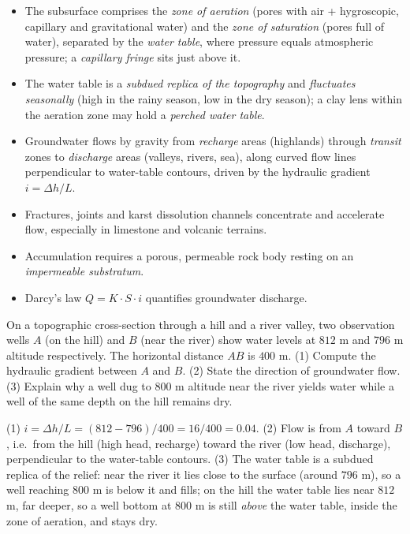 \documentclass[11pt]{article}
\begin{document}
\begin{aretenir}
\begin{itemize}
\item The subsurface comprises the \emph{zone of aeration} (pores with air + hygroscopic, capillary and gravitational water) and the \emph{zone of saturation} (pores full of water), separated by the \emph{water table}, where pressure equals atmospheric pressure; a \emph{capillary fringe} sits just above it.
\item The water table is a \emph{subdued replica of the topography} and \emph{fluctuates seasonally} (high in the rainy season, low in the dry season); a clay lens within the aeration zone may hold a \emph{perched water table}.
\item Groundwater flows by gravity from \emph{recharge} areas (highlands) through \emph{transit} zones to \emph{discharge} areas (valleys, rivers, sea), along curved flow lines perpendicular to water-table contours, driven by the hydraulic gradient $i = \Delta h / L$.
\item Fractures, joints and karst dissolution channels concentrate and accelerate flow, especially in limestone and volcanic terrains.
\item Accumulation requires a porous, permeable rock body resting on an \emph{impermeable substratum}.
\item Darcy's law $Q = K \cdot S \cdot i$ quantifies groundwater discharge.
\end{itemize}
\end{aretenir}

\begin{exercice}
On a topographic cross-section through a hill and a river valley, two observation wells $A$ (on the hill) and $B$ (near the river) show water levels at $812$ m and $796$ m altitude respectively. The horizontal distance $AB$ is $400$ m. (1) Compute the hydraulic gradient between $A$ and $B$. (2) State the direction of groundwater flow. (3) Explain why a well dug to $800$ m altitude near the river yields water while a well of the same depth on the hill remains dry.
\end{exercice}

\begin{corrige}[Exercise 1]
(1) $i = \Delta h / L = (812 - 796)/400 = 16/400 = 0.04$. (2) Flow is from $A$ toward $B$, i.e.\ from the hill (high head, recharge) toward the river (low head, discharge), perpendicular to the water-table contours. (3) The water table is a subdued replica of the relief: near the river it lies close to the surface (around $796$ m), so a well reaching $800$ m is below it and fills; on the hill the water table lies near $812$ m, far deeper, so a well bottom at $800$ m is still \emph{above} the water table, inside the zone of aeration, and stays dry.
\end{corrige}
\end{document}
